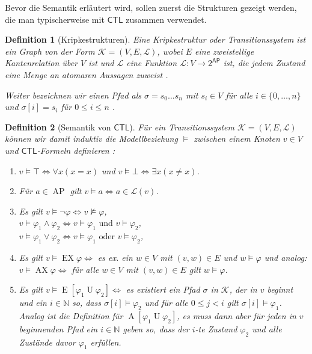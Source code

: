 \documentclass{lni}
\theoremstyle{def_style}
\newtheorem{definition}{Definition}[section]
\theoremstyle{break}
\newcommand{\AU}[2]{\operatorname{A}[#1\operatorname{U}#2]}
\newcommand{\EU}[2]{\operatorname{E}[#1\operatorname{U}#2]}
\newcommand{\CTL}{\mathsf{CTL}}
\begin{document}
Bevor die Semantik erläutert wird, sollen zuerst die Strukturen gezeigt werden, die man typischerweise mit $\CTL$ zusammen verwendet.

\begin{definition}[Kripkestrukturen]
	Eine \textit{Kripkestruktur} oder \textit{Transitionssystem} ist ein Graph von der Form $\mathcal{K}=(V, E, \mathcal{L})$, wobei $E$ eine zweistellige Kantenrelation über $V$ ist und $\mathcal{L}$ eine Funktion $\mathcal{L}:V\to2^{\mathsf{AP}}$ ist, die jedem Zustand eine Menge an atomaren Aussagen zuweist 	\cite{clarke1982design,clarke1986automatic}.
	
	Weiter bezeichnen wir einen Pfad als $\sigma=s_0\dots s_n$ mit $s_i\in V$ für alle $i\in\{0,\dots,n\}$ und $\sigma[i]=s_i$ für $0\leq i \leq n$ \cite{baier2008principles}.
\end{definition}

\begin{definition}[Semantik von $\CTL$]
	Für ein Transitionssystem $\mathcal{K}=(V,E,\mathcal{L})$ können wir damit induktiv die Modellbeziehung $\models$ zwischen einem Knoten $v\in V$ und $\CTL$-Formeln definieren \cite{baier2008principles}:
	\begin{enumerate}
		\item $v\models \top \Leftrightarrow \forall x(x=x)$ und $v\models \bot \Leftrightarrow \exists x(x\neq x)$.
		\item Für $a\in \operatorname{AP}$ gilt $v\models a \Leftrightarrow a\in \mathcal{L}(v)$.
		\item Es gilt $v\models \neg \varphi \Leftrightarrow v\not\models \varphi$,\\
		$v\models \varphi_1 \land \varphi_2 \Leftrightarrow v\models \varphi_1 \text{ und } v\models \varphi_2$,\\
		$v\models \varphi_1 \lor \varphi_2 \Leftrightarrow v\models \varphi_1 \text{ oder } v\models \varphi_2$,
		\item Es gilt $v\models \operatorname{EX}\varphi \Leftrightarrow$ es ex. ein $w\in V$ mit $(v,w)\in E$ und $w\models \varphi$ und analog:\\ 
		$v\models \operatorname{AX}\varphi \Leftrightarrow$ für alle $w\in V$ mit $(v,w)\in E$ gilt $w\models \varphi$.
		\item Es gilt $v\models \EU{\varphi_1}{\varphi_2} \Leftrightarrow$ es existiert ein Pfad $\sigma$ in $\mathcal{K}$, der in $v$ beginnt und ein $i\in \mathbb{N}$ so, dass $\sigma[i]\models \varphi_2$ und für alle $0\leq j < i$ gilt $\sigma[i]\models \varphi_1$. 
		Analog ist die Definition für $\AU{\varphi_1}{\varphi_2}$, es muss dann aber für jeden in $v$ beginnenden Pfad ein $i\in \mathbb{N}$ geben so, dass der $i$-te Zustand $\varphi_2$ und alle Zustände davor $\varphi_1$ erfüllen.
	\end{enumerate}
\end{definition}
\end{document}
